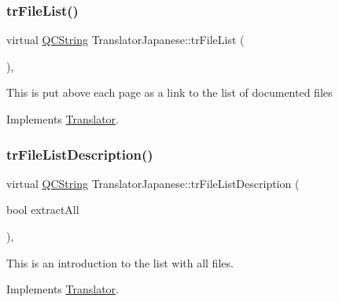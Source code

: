 \mbox{\label{class_translator_japanese_ac148fa286f2272c5b9f3eba1e1e7a999}} 
\subsubsection{\texorpdfstring{trFileList()}{trFileList()}}
{\footnotesize\ttfamily virtual \mbox{\hyperlink{class_q_c_string}{Q\+C\+String}} Translator\+Japanese\+::tr\+File\+List (\begin{DoxyParamCaption}{ }\end{DoxyParamCaption})\hspace{0.3cm}{\ttfamily [inline]}, {\ttfamily [virtual]}}

This is put above each page as a link to the list of documented files 

Implements \mbox{\hyperlink{class_translator}{Translator}}.

\mbox{\label{class_translator_japanese_a171ccbfdd6e05fe54ae1ebcb43c19e47}} 
\subsubsection{\texorpdfstring{trFileListDescription()}{trFileListDescription()}}
{\footnotesize\ttfamily virtual \mbox{\hyperlink{class_q_c_string}{Q\+C\+String}} Translator\+Japanese\+::tr\+File\+List\+Description (\begin{DoxyParamCaption}\item[{bool}]{extract\+All }\end{DoxyParamCaption})\hspace{0.3cm}{\ttfamily [inline]}, {\ttfamily [virtual]}}

This is an introduction to the list with all files. 

Implements \mbox{\hyperlink{class_translator}{Translator}}.

\mbox{\label{class_translator_japanese_a9c84ad85b63c6806faa49dcf310d361d}} 
